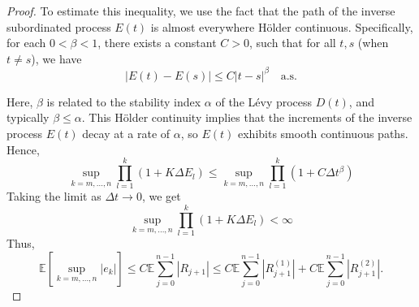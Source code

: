 \documentclass[10pt,reqno,final]{amsart}
\theoremstyle{plain}
\theoremstyle{definition}
\theoremstyle{remark}
\numberwithin{equation}{section}
\numberwithin{figure}{section}
\numberwithin{table}{section}
\begin{document}
\begin{proof}
	To estimate this inequality, we use the fact that the path of the inverse subordinated process \( E(t) \) is almost everywhere Hölder continuous. Specifically, for each \( 0 < \beta < 1 \), there exists a constant \( C > 0 \), such that for all \( t, s \) (when \( t \neq s \)), we have
	\begin{equation}\label{Einc}
		|E(t) - E(s)| \leq C |t - s|^\beta \quad \text{a.s.}
	\end{equation}
	
	Here, \( \beta \) is related to the stability index \( \alpha \) of the Lévy process \( D(t) \), and typically \( \beta \leq \alpha \). This Hölder continuity implies that the increments of the inverse process \( E(t) \) decay at a rate of \( \alpha \), so \( E(t) \) exhibits smooth continuous paths. Hence,
	\begin{equation*}
		\sup\limits_{k=m, \ldots, n} \prod\limits_{l=1}^{k} (1 + K \Delta E_l) \leq \sup\limits_{k=m, \ldots, n} \prod\limits_{l=1}^{k} (1 + C \Delta t^\beta)
	\end{equation*}
	Taking the limit as \( \Delta t \to 0 \), we get
	\begin{equation*}
		\sup\limits_{k=m, \ldots, n} \prod\limits_{l=1}^{k} (1 + K \Delta E_l) < \infty
	\end{equation*}
	Thus,
	\begin{equation}
		\mathbb{E}\left[\sup\limits_{k=m, \ldots, n}\left|e_k\right|\right] \leq C\mathbb{E}\sum_{j=0}^{n-1}|R_{j+1}| \leq C\mathbb{E}\sum\limits_{j=0}^{n-1}|R_{j+1}^{(1)}| + C\mathbb{E}\sum\limits_{j=0}^{n-1}|R_{j+1}^{(2)}|.
	\end{equation}
	

\end{proof}
\end{document}
